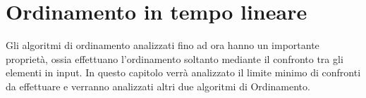 \chapter{Ordinamento in tempo lineare}
Gli algoritmi di ordinamento analizzati fino ad ora hanno un importante proprietà,
ossia effettuano l'ordinamento soltanto mediante il confronto tra gli elementi in input.
In questo capitolo verrà analizzato il limite minimo di confronti da effettuare e
verranno analizzati altri due algoritmi di Ordinamento.
